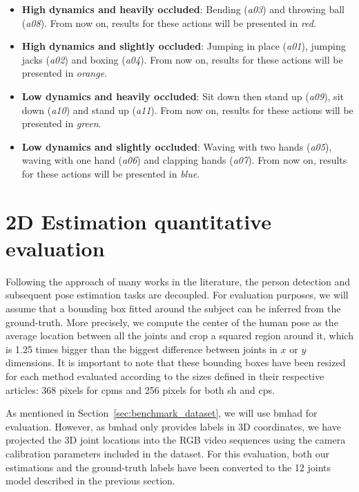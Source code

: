 \begin{itemize}
    \item \textbf{High dynamics and heavily occluded}: Bending (\textit{a03}) and throwing ball (\textit{a08}). From now on, results for these actions will be presented in \textit{red}.
    \item \textbf{High dynamics and slightly occluded}: Jumping in place (\textit{a01}), jumping jacks (\textit{a02}) and boxing (\textit{a04}). From now on, results for these actions will be presented in \textit{orange}.
    \item \textbf{Low dynamics and heavily occluded}: Sit down then stand up (\textit{a09}), sit down (\textit{a10}) and stand up (\textit{a11}). From now on, results for these actions will be presented in \textit{green}.
    \item \textbf{Low dynamics and slightly occluded}: Waving with two hands (\textit{a05}), waving with one hand (\textit{a06}) and clapping hands (\textit{a07}). From now on, results for these actions will be presented in \textit{blue}.
\end{itemize}

\section{2D Estimation quantitative evaluation}\label{sec:2d_estimation_evaluation}
Following the approach of many works in the literature, the person detection and subsequent pose estimation tasks are decoupled. For evaluation purposes, we will assume that a bounding box fitted around the subject can be inferred from the ground-truth. More precisely, we compute the center of the human pose as the average location between all the joints and crop a squared region around it, which is 1.25 times bigger than the biggest difference between joints in \(x\) or \(y\) dimensions. It is important to note that these bounding boxes have been resized for each method evaluated according to the sizes defined in their respective articles: 368 pixels for \glspl{cpm} and 256 pixels for both \gls{sh} and \glspl{cp}.

As mentioned in Section~\ref{sec:benchmark_dataset}, we will use \gls{bmhad} for evaluation. However, as \gls{bmhad} only provides labels in 3D coordinates, we have projected the 3D joint locations into the RGB video sequences using the camera calibration parameters included in the dataset. For this evaluation, both our estimations and the ground-truth labels have been converted to the 12 joints model described in the previous section.

